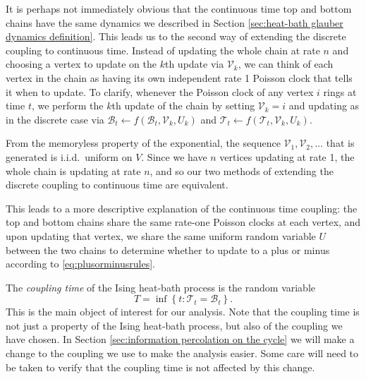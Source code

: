 	It is perhaps not immediately obvious that the continuous time top and bottom chains have the same dynamics we described in Section \ref{sec:heat-bath glauber dynamics definition}. This leads us to the second way of extending the discrete coupling to continuous time. Instead of updating the whole chain at rate $n$ and choosing a vertex to update on the $k$th update via $\mathcal{V}_k$, we can think of each vertex in the chain as having its own independent rate 1 Poisson clock that tells it when to update. To clarify, whenever the Poisson clock of any vertex $i$ rings at time $t$, we perform the $k$th update of the chain by setting $\mathcal{V}_k = i$ and updating as in the discrete case via $\mathscr{B}_t \leftarrow f(\mathscr{B}_t, \mathcal{V}_k, U_k)$ and $\mathscr{T}_t \leftarrow f(\mathscr{T}_t, \mathcal{V}_k, U_k)$.

	From the memoryless property of the exponential, the sequence $\mathcal{V}_1, \mathcal{V}_2, \dots$ that is generated is i.i.d.\ uniform on $V$. Since we have $n$ vertices updating at rate 1, the whole chain is updating at rate $n$, and so our two methods of extending the discrete coupling to continuous time are equivalent.

		
	

	



	This leads to a more descriptive explanation of the continuous time coupling: the top and bottom chains share the same rate-one Poisson clocks at each vertex, and upon updating that vertex, we share the same uniform random variable $U$ between the two chains to determine whether to update to a plus or minus according to \eqref{eq:plusorminusrules}.

	The \emph{coupling time} of the Ising heat-bath process is the random variable
	\begin{equation}
		T = \inf \left\{t : \mathscr{T}_t = \mathscr{B}_t \right\}.	
	\end{equation}
	This is the main object of interest for our analysis. Note that the coupling time is not just a property of the Ising heat-bath process, but also of the coupling we have chosen. In Section \ref{sec:information percolation on the cycle} we will make a change to the coupling we use to make the analysis easier. Some care will need to be taken to verify that the coupling time is not affected by this change.

